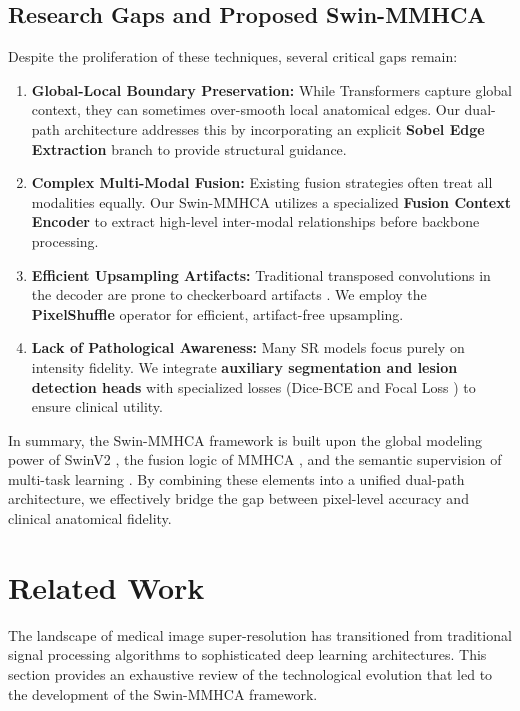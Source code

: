 \documentclass{IEEEoj}
\begin{document}
\subsection{Research Gaps and Proposed Swin-MMHCA}
Despite the proliferation of these techniques, several critical gaps remain:
\begin{enumerate}
    \item \textbf{Global-Local Boundary Preservation:} While Transformers capture global context, they can sometimes over-smooth local anatomical edges. Our dual-path architecture addresses this by incorporating an explicit \textbf{Sobel Edge Extraction} branch \cite{fscwrn} to provide structural guidance.
    \item \textbf{Complex Multi-Modal Fusion:} Existing fusion strategies often treat all modalities equally. Our Swin-MMHCA utilizes a specialized \textbf{Fusion Context Encoder} to extract high-level inter-modal relationships before backbone processing.
    \item \textbf{Efficient Upsampling Artifacts:} Traditional transposed convolutions in the decoder are prone to checkerboard artifacts \cite{srcnn}. We employ the \textbf{PixelShuffle} operator \cite{edsr} for efficient, artifact-free upsampling.
    \item \textbf{Lack of Pathological Awareness:} Many SR models focus purely on intensity fidelity. We integrate \textbf{auxiliary segmentation and lesion detection heads} with specialized losses (Dice-BCE and Focal Loss \cite{Sajol2024}) to ensure clinical utility.
\end{enumerate}

In summary, the Swin-MMHCA framework is built upon the global modeling power of SwinV2 \cite{swin_trans}, the fusion logic of MMHCA \cite{Georgescu2023}, and the semantic supervision of multi-task learning \cite{segsrgan}. By combining these elements into a unified dual-path architecture, we effectively bridge the gap between pixel-level accuracy and clinical anatomical fidelity.


\section{Related Work}
The landscape of medical image super-resolution has transitioned from traditional signal processing algorithms to sophisticated deep learning architectures. This section provides an exhaustive review of the technological evolution that led to the development of the Swin-MMHCA framework.
\end{document}
